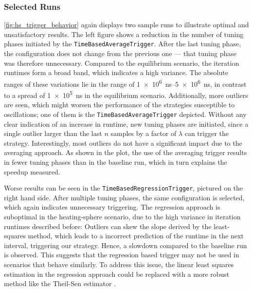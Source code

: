 \subsubsection{Selected Runs}
\autoref{fig:hs_trigger_behavior} again displays two sample runs to illustrate optimal and unsatisfactory results. The left figure shows a reduction in the number of tuning phases initiated by the \texttt{TimeBasedAverageTrigger}. After the last tuning phase, the configuration does not change from the previous one --- that tuning phase was therefore unnecessary. Compared to the equilibrium scenario, the iteration runtimes form a broad band, which indicates a high variance. The absolute ranges of these variations lie in the range of \SIrange{1e6}{5e6}{\nano\second}, in contrast to a spread of \qty{1e5}{\nano\second} in the equilibrium scenario. Additionally, more outliers are seen, which might worsen the performance of the strategies susceptible to oscillations; one of them is the \texttt{TimeBasedAverageTrigger} depicted. Without any clear indication of an increase in runtime, new tuning phases are initiated, since a single outlier larger than the last $n$ samples by a factor of $\lambda$ can trigger the strategy. Interestingly, most outliers do not have a significant impact due to the averaging approach. As shown in the plot, the use of the averaging trigger results in fewer tuning phases than in the baseline run, which in turn explains the speedup measured.

Worse results can be seen in the \texttt{TimeBasedRegressionTrigger}, pictured on the right hand side. After multiple tuning phases, the same configuration is selected, which again indicates unnecessary triggering. The regression approach is suboptimal in the heating-sphere scenario, due to the high variance in iteration runtimes described before: Outliers can skew the slope derived by the least-squares method, which leads to a incorrect prediction of the runtime in the next interval, triggering our strategy. Hence, a slowdown compared to the baseline run is observed. This suggests that the regression based trigger may not be used in scenarios that behave similarly. To address this issue, the linear least squares estimation in the regression approach could be replaced with a more robust method like the Theil-Sen estimator \cite{Wilcox2012}.



